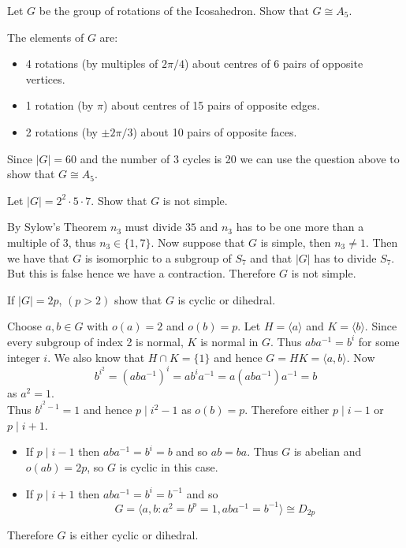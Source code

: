 \documentclass[12pt, answers]{exam}
\begin{document}
\begin{questions}
        \question Let $G$ be the group of rotations of the Icosahedron. Show that $G\cong A_5$.
        \begin{solution}
            The elements of $G$ are:
            \begin{itemize}
                \item 4 rotations (by multiples of $2\pi / 4$) about centres of 6 pairs of opposite vertices.
                \item 1 rotation  (by $\pi$) about centres of 15 pairs of opposite edges.
                \item 2 rotations (by $\pm 2\pi / 3$) about 10 pairs of opposite faces.
            \end{itemize}
            Since $|G| = 60$ and the number of 3 cycles is 20 we can use the question above to show that $G \cong A_5$.
        \end{solution}

        \question Let $|G| = 2^2 \cdot 5 \cdot 7$. Show that $G$ is not simple.
        \begin{solution}
            By Sylow's Theorem $n_3$ must divide $35$ and $n_3$ has to be one more than a multiple of 3, thus
            $n_3 \in \{ 1, 7 \}$. Now suppose that $G$ is simple, then $n_3 \neq 1$. Then we have that $G$ is isomorphic
            to a subgroup of $S_7$ and that $|G|$ has to divide $S_7$. But this is false hence we have a contraction. Therefore
            $G$ is not simple.
        \end{solution}

        \question If $|G| = 2p$, $(p > 2)$ show that $G$ is cyclic or dihedral.
        \begin{solution}
            Choose $a, b \in G$ with $o(a) = 2$ and $o(b) = p$. Let $H = \langle a \rangle$ and $K = \langle b \rangle$.
            Since every subgroup of index 2 is normal, $K$ is normal in $G$. Thus $aba^{-1} = b^i$ for some integer $i$.
            We also know that $H \cap K = \{1\}$ and hence $G = HK = \langle a, b \rangle$. Now
            \[ b^{i^2} = (aba^{-1})^{i} = ab^ia^{-1} = a(aba^{-1})a^{-1} = b\]
            as $a^2 = 1$.\\
            Thus $b^{i^2 - 1} = 1$ and hence $p \mathrel{|} i^2 - 1$ as $o(b) = p$. Therefore either $p \mathrel{|} i - 1$
            or $p \mathrel{|} i + 1$.
            \begin{itemize}
                \item If $p \mathrel{|} i - 1$ then $aba^{-1} = b^i = b$ and so $ab = ba$. Thus $G$ is abelian and
                $o(ab) = 2p$, so $G$ is cyclic in this case.
                \item If $p \mathrel{|} i + 1$ then $aba^{-1} = b^i = b^{-1}$ and so
                \[ G = \langle a, b \colon a^2 = b^p = 1, aba^{-1} = b^{-1} \rangle \cong D_{2p} \]
            \end{itemize}
            Therefore $G$ is either cyclic or dihedral.
        \end{solution}


\end{questions}
\end{document}
